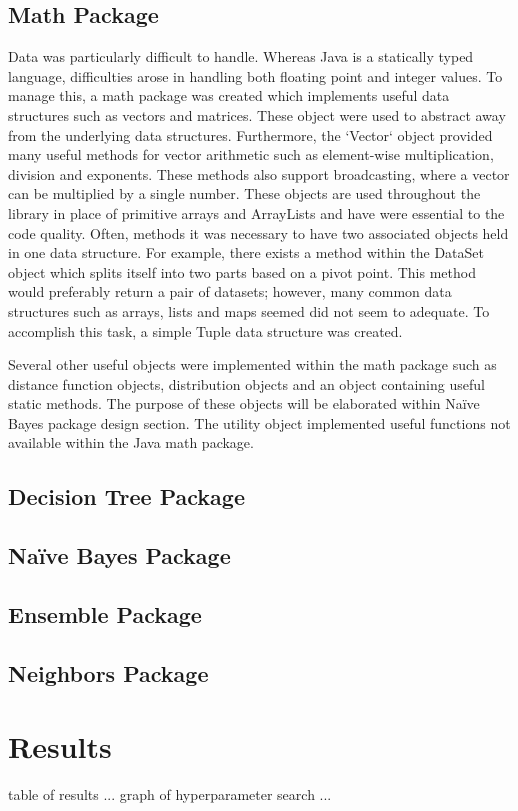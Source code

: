 \documentclass[11pt]{article}
\begin{document}
\subsection{Math Package}
Data was particularly difficult to handle. Whereas Java is a statically typed language, difficulties arose in handling both floating point and integer values. To manage this, a math package was created which implements useful data structures such as vectors and matrices. These object were used to abstract away from the underlying data structures. Furthermore, the `Vector` object provided many useful methods for vector arithmetic such as element-wise multiplication, division and exponents. These methods also support broadcasting, where a vector can be multiplied by a single number. These objects are used throughout the library in place of primitive arrays and ArrayLists and have were essential to the code quality. Often, methods it was necessary to have two associated objects held in one data structure. For example, there exists a method within the DataSet object which splits itself into two parts based on a pivot point. This method would preferably return a pair of datasets; however, many common data structures such as arrays, lists and maps seemed did not seem to adequate. To accomplish this task, a simple Tuple data structure was created.

Several other useful objects were implemented within the math package such as distance function objects, distribution objects and an object containing useful static methods. The purpose of these objects will be elaborated within Naïve Bayes package design section. The utility object implemented useful functions not available within the Java math package.

\subsection{Decision Tree Package}


\subsection{Naïve Bayes Package}
\subsection{Ensemble Package}
\subsection{Neighbors Package}

\section{Results}
table of results ...
graph of hyperparameter search ...



\end{document}
